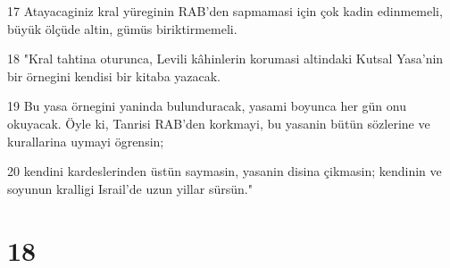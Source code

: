 \par 17 Atayacaginiz kral yüreginin RAB'den sapmamasi için çok kadin edinmemeli, büyük ölçüde altin, gümüs biriktirmemeli.
\par 18 "Kral tahtina oturunca, Levili kâhinlerin korumasi altindaki Kutsal Yasa'nin bir örnegini kendisi bir kitaba yazacak.
\par 19 Bu yasa örnegini yaninda bulunduracak, yasami boyunca her gün onu okuyacak. Öyle ki, Tanrisi RAB'den korkmayi, bu yasanin bütün sözlerine ve kurallarina uymayi ögrensin;
\par 20 kendini kardeslerinden üstün saymasin, yasanin disina çikmasin; kendinin ve soyunun kralligi Israil'de uzun yillar sürsün."

\chapter{18}

